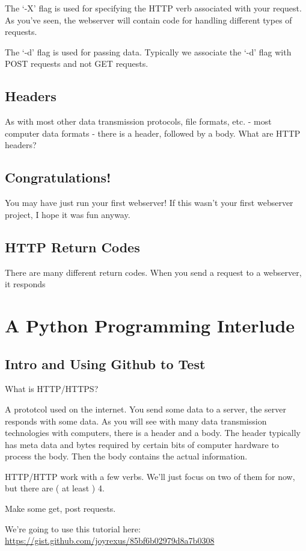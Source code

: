 \documentclass[10pt]{article}
\begin{document}
The `-X' flag is used for specifying the HTTP verb associated with your request. As you've seen, the webserver will contain code for handling different types of requests.

The `-d' flag is used for passing data. Typically we associate the `-d' flag with POST requests and not GET requests.

\subsection{Headers}
As with most other data transmission protocols, file formats, etc. - most computer data formats - there is a header, followed by a body. What are HTTP headers?


\subsection{Congratulations!}
You may have just run your first webserver! If this wasn't your first webserver project, I hope it was fun anyway.

\subsection{HTTP Return Codes}
There are many different return codes. When you send a request to a webserver, it responds

\section{A Python Programming Interlude}


\subsection{Intro and Using Github to Test}
What is HTTP/HTTPS?

A prototcol used on the internet. You send some data to a server, the server responds with some data. As you will see with many data transmission technologies with computers, there is a header and a body. The header typically has meta data and bytes required by certain bits of computer hardware to process the body. Then the body contains the actual information.

HTTP/HTTP work with a few verbs. We'll just focus on two of them for now, but there are ( at least ) 4. 

Make some get, post requests. 

We're going to use this tutorial here:
\url{https://gist.github.com/joyrexus/85bf6b02979d8a7b0308}
\end{document}
